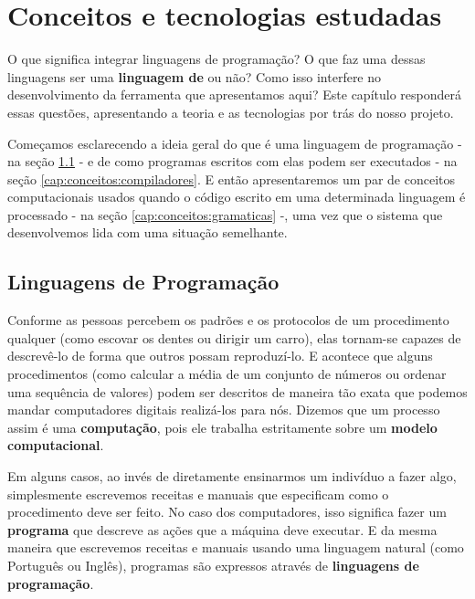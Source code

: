 
\chapter{Conceitos e tecnologias estudadas}
\label{cap:conceitos}

  O que significa integrar linguagens de programação? O que faz uma dessas
  linguagens ser uma \textbf{linguagem de \script{}} ou não? Como isso interfere
  no desenvolvimento da ferramenta que apresentamos aqui? Este capítulo
  responderá essas questões, apresentando a teoria e as tecnologias por trás do
  nosso projeto.

  Começamos esclarecendo a ideia geral do que é uma linguagem de programação -
  na seção \ref{cap:conceitos:linguagens} - e de como programas escritos com
  elas podem ser executados - na seção \ref{cap:conceitos:compiladores}.
  E então apresentaremos um par de conceitos computacionais usados
  quando o código escrito em uma determinada linguagem é processado - na seção
  \ref{cap:conceitos:gramaticas} -, uma vez que o sistema que desenvolvemos lida
  com uma situação semelhante.

  \section{Linguagens de Programação}
  \label{cap:conceitos:linguagens}

  Conforme as pessoas percebem os padrões e os protocolos de um procedimento
  qualquer (como escovar os dentes ou dirigir um carro), elas tornam-se capazes
  de descrevê-lo de forma que outros possam reproduzí-lo. E acontece que alguns
  procedimentos (como calcular a média de um conjunto de números ou ordenar uma
  sequência de valores) podem ser descritos de maneira tão exata que podemos
  mandar computadores digitais realizá-los para nós. Dizemos que um processo
  assim é uma \textbf{computação}, pois ele trabalha estritamente sobre um
  \textbf{modelo computacional}.
  
  Em alguns casos, ao invés de diretamente ensinarmos um indivíduo a fazer algo,
  simplesmente escrevemos receitas e manuais que especificam como o procedimento
  deve ser feito. No caso dos computadores, isso significa fazer um
  \textbf{programa} que descreve as ações que a máquina deve executar. E da
  mesma maneira que escrevemos receitas e manuais usando uma linguagem natural
  (como Português ou Inglês), programas são expressos através de
  \textbf{linguagens de programação}.

